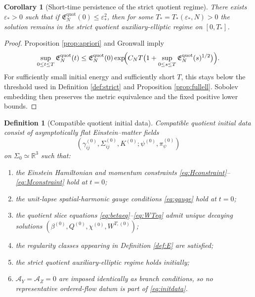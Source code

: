 \documentclass[11pt]{article}
\newcommand{\AY}{\mathcal A_Y}
\newcommand{\AZ}{\mathcal A_Z}
\newtheorem{definition}{Definition}
\newtheorem{corollary}{Corollary}
\begin{document}
\begin{corollary}[Short-time persistence of the strict quotient regime]
\label{cor:persist}
There exists \(\varepsilon_*>0\) such that if \(\mathfrak E_N^{\mathrm{quot}}(0)\le \varepsilon_*^2\), then for some \(T_*=T_*(\varepsilon_*,N)>0\) the solution remains in the strict quotient auxiliary-elliptic regime on \([0,T_*]\).
\end{corollary}

\begin{proof}
Proposition \ref{prop:apriori} and Gronwall imply
\[
\sup_{0\le t\le T}\mathfrak E_N^{\mathrm{quot}}(t)
\le
\mathfrak E_N^{\mathrm{quot}}(0)
\exp\!\Bigl(C_NT\bigl(1+\sup_{0\le s\le T}\mathfrak E_N^{\mathrm{quot}}(s)^{1/2}\bigr)\Bigr).
\]
For sufficiently small initial energy and sufficiently short \(T\), this stays below the threshold used in Definition \ref{def:strict} and Proposition \ref{prop:fullell}. Sobolev embedding then preserves the metric equivalence and the fixed positive lower bounds.
\end{proof}

\begin{definition}[Compatible quotient initial data]
\label{def:init}
Compatible quotient initial data consist of asymptotically flat Einstein--matter fields
\begin{equation}
(\gamma_{ij}^{(0)},\Sigma_{ij}^{(0)},K^{(0)};\psi^{(0)},\pi_\psi^{(0)})
\label{eq:initdata}
\end{equation}
on \(\Sigma_0\simeq\mathbb R^3\) such that:
\begin{enumerate}
    \item the Einstein Hamiltonian and momentum constraints \eqref{eq:Hconstraint}--\eqref{eq:Mconstraint} hold at \(t=0\);
    \item the unit-lapse spatial-harmonic gauge conditions \eqref{eq:gauge} hold at \(t=0\);
    \item the quotient slice equations \eqref{eq:betaeq}--\eqref{eq:WTeq} admit unique decaying solutions \((\beta^{(0)},Q^{(0)},\chi^{(0)},W^{T,(0)})\);
    \item the regularity classes appearing in Definition \ref{def:E} are satisfied;
    \item the strict quotient auxiliary-elliptic regime holds initially;
    \item \(\AY=\AZ=0\) are imposed identically as branch conditions, so no representative ordered-flow datum is part of \eqref{eq:initdata}.
\end{enumerate}
\end{definition}
\end{document}

